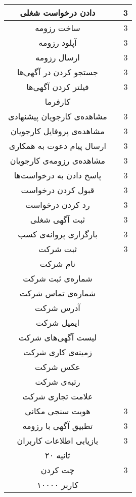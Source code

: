 \begin{longtable}{|c|c|c|}
	\hline
	دادن درخواست شغلی &
	\asje &
	3 \\
	\hline
	ساخت رزومه &
	\asjs &
	3 \\
	\hline
	آپلود رزومه &
	\asjs &
	3 \\
	\hline
	ارسال رزومه &
	\asje &
	3 \\
	\hline
	جستجو کردن در آگهی‌ها &
	\asus &
	3 \\
	\hline
	فیلتر کردن آگهی‌ها &
	\asus &
	3 \\
	\hline
	کارفرما &
	\myc &
	\oned \\
	\hline
	مشاهده‌ی کارجویان پیشنهادی &
	\ases &
	3 \\
	\hline
	مشاهده‌ی پروفایل کارجویان &
	\asus &
	3 \\
	\hline
	ارسال پیام دعوت به همکاری &
	\asej &
	3 \\
	\hline
	مشاهده‌ی رزومه‌ی کارجویان &
	\asus &
	3 \\
	\hline
	پاسخ دادن به درخواست‌ها &
	\aser &
	3 \\
	\hline
	قبول کردن درخواست &
	\aser &
	3 \\
	\hline
	رد کردن درخواست &
	\aser &
	3 \\
	\hline
	ثبت آگهی‌ شغلی &
	\ases &
	3 \\
	\hline
	بارگزاری پروانه‌ی کسب &
	\ases &
	3 \\
	\hline
	ثبت شرکت & 
	\ases & 
	3 \\
	\hline
	نام شرکت & 
	\mya & 
	\oneh \\
	\hline
	شماره‌ی ثبت شرکت & 
	\mya & 
	\oneh \\
	\hline
	شماره‌ی تماس شرکت & 
	\mya & 
	\oneh \\
	\hline
	آدرس شرکت & 
	\mya & 
	\oneh \\
	\hline
	ایمیل شرکت & 
	\mya & 
	\oneh \\
	\hline
	لیست آگهی‌های شرکت & 
	\mya & 
	\oneh \\
	\hline
	زمینه‌ی کاری شرکت & 
	\mya & 
	\oneh \\
	\hline
	عکس شرکت & 
	\mya & 
	\oneh \\
	\hline
	رتبه‌ی شرکت & 
	\mya & 
	\oneh \\
	\hline
	علامت تجاری شرکت & 
	\mya & 
	\oneh \\
	\hline
	هویت سنجی مکانی & 
	\asse & 
	3 \\
	\hline
	تطبیق آگهی با رزومه & 
	\assj & 
	3 \\
	\hline
	بازیابی اطلاعات کاربران & 
	\assu & 
	3 \\
	\hline
	۲۰ ثانیه & 
	\myv & 
	\fiveb \\
	\hline
	چت کردن & 
	\asje & 
	3 \\
	\hline
	۱۰۰۰۰ کاربر & 
	\myv & 
	\fiveb \\
	\hline
\end{longtable}
\label{table:domain}

